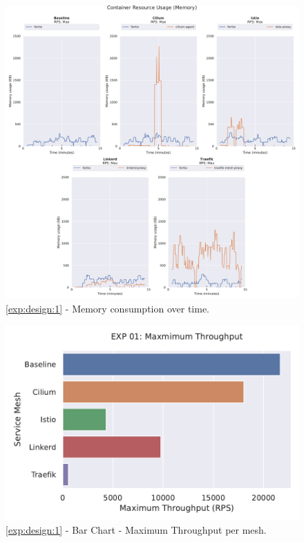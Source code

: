 \begin{figure}[h]
    \centering
    
    \includegraphics[width=\linewidth]{5_experimental_evaluation/figures/exp_01-memory-results.pdf}

    \caption{\ref{exp:design:1} - Memory consumption over time.}
    
    \label{fig:appendix:exp:result:01:memory:timeline}
\end{figure}


\begin{figure}[h]
    \centering
    
    \includegraphics[width=\linewidth]{5_experimental_evaluation/figures/exp_01-throughput-barchart.pdf}

    \caption{\ref{exp:design:1} - Bar Chart - Maximum Throughput per mesh.}
    
    \label{fig:appendix:exp:result:01:throughput:barchart}
\end{figure}


